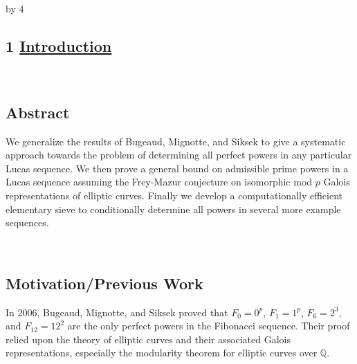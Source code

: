 \documentclass[12pt]{scrartcl}
\def\Q{{\mathbb Q}}
\def\anzspalten{4}
\newlength{\kastenwidth}
\newenvironment{kasten}{%
  \begin{lrbox}{\dummybox}%
    \begin{minipage}{0.96\linewidth}}%
    {\end{minipage}%
  \end{lrbox}%
  \raisebox{-\depth}{\psshadowbox[framesep=1em]{\usebox{\dummybox}}}\\[0.5em]}
\newenvironment{spalte}{%
  \setlength\kastenwidth{1.2\textwidth}
  \divide\kastenwidth by \anzspalten
  \begin{minipage}[t]{\kastenwidth}}{\end{minipage}\hfill}
\begin{document}
\begin{lrbox}{\spalten}
  \parbox[t][\textheight]{1.3\textwidth}{%
    \hfill
    \begin{spalte}
\vspace{-2.81in}
      \begin{kasten}
\section*{1 \hspace{0.1cm} {\color{red} \underline{Introduction}}}
\end{kasten}

\begin{kasten}
\subsection*{\color{blue} Abstract}
{
We generalize the results of Bugeaud, Mignotte, and Siksek \cite{siksek06} to give a systematic approach towards the problem of determining all perfect powers in any particular Lucas sequence.  We then prove a general bound on admissible prime powers in a Lucas sequence assuming the Frey-Mazur conjecture on isomorphic mod $p$ Galois representations of elliptic curves.  Finally we develop a computationally efficient elementary sieve to conditionally determine all powers in several more example sequences.
} 
\end{kasten}

\begin{kasten}

\subsection*{\color{blue} Motivation/Previous Work}
In 2006, Bugeaud, Mignotte, and Siksek proved that
$F_0=0^p$, $F_1=1^p$, $F_6=2^3$, and $F_{12} = 12^2$ are the only perfect powers in the Fibonacci sequence.  Their proof relied upon the theory of elliptic curves and their associated Galois representations, especially the modularity theorem for elliptic curves over $\Q$.

\end{kasten}

\begin{kasten}


\end{kasten}
\end{spalte}}
\end{lrbox}
\end{document}

